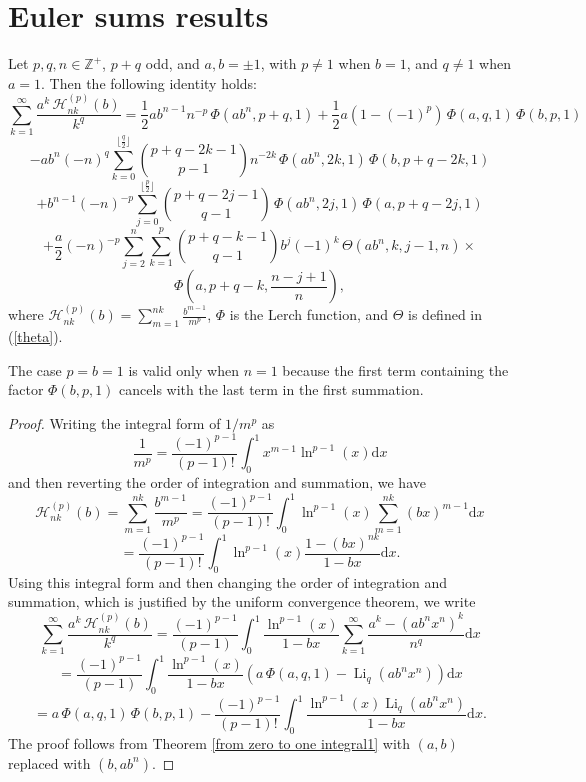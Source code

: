 \documentclass[11pt,reqno]{article}
\begin{document}
\section{Euler sums results}
\begin{theorem} \label{thm of H_n}
	Let $p,q,n\in\mathbb{Z}^{+}$, $p+q$ odd, and $a,b=\pm1$, with $p\neq1$ when $b=1$, and $q\neq1$ when $a=1$. Then the following identity holds:
	\[\sum_{k=1}^\infty\frac{a^k\, \mathcal{H}_{nk}^{(p)}(b)}{k^q}=\frac12 ab^{n-1}n^{-p}\,\Phi(ab^n,p+q,1)+\frac12a(1-{(-1)}^{p})\,\Phi(a,q,1)\,\Phi(b,p,1)\]
	\[-ab^n{(-n)}^{q}\sum_{k=0}^{\lfloor\frac{q}{2}\rfloor}\binom{p+q-2k-1}{p-1}n^{-2k}\,\Phi(ab^n,2k,1)\,\Phi(b,p+q-2k,1)\]
	\[+b^{n-1}{(-n)}^{-p}\sum_{j=0}^{\lfloor\frac{p}{2}\rfloor}\binom{p+q-2j-1}{q-1}\,\Phi(ab^n,2j,1)\,\Phi(a,p+q-2j,1)\]
	\[+\frac{a}{2}{(-n)}^{-p}\sum_{j=2}^{n}\sum_{k=1}^{p}\binom{p+q-k-1}{q-1}b^{j}{(-1)}^{k}\,\Theta(ab^n,k,j-1,n)\times\]
	\[\Phi\left(a,p+q-k,\frac{n-j+1}{n}\right),\]
	where $\mathcal{H}_{nk}^{(p)}(b)=\sum_{m=1}^{nk}\frac{b^{m-1}}{m^p}$, $\Phi$ is the Lerch function, and $\Theta$ is defined in (\ref{theta}).
\end{theorem}
\begin{remark}
	The case $p=b=1$ is valid only when $n=1$ because the first term containing the factor $\Phi(b,p,1)$ cancels with the last term in the first summation.
\end{remark}
\begin{proof} Writing the integral form of $1/m^{p}$ as
	\[\frac{1}{m^p}=\frac{{(-1)}^{p-1}}{(p-1)!}\int_0^1x^{m-1}\ln^{p-1}(x)\mathrm{d} x\]
	and then reverting the order of integration and summation, we have
	\[\mathcal{H}_{nk}^{(p)}(b)=\sum_{m=1}^{nk}\frac{b^{m-1}}{m^p}=\frac{{(-1)}^{p-1}}{(p-1)!}\int_0^1 \ln^{p-1}(x)\sum_{m=1}^{nk} (bx)^{m-1}\mathrm{d} x\]
	\[=\frac{{(-1)}^{p-1}}{(p-1)!}\int_0^1 \ln^{p-1}(x)\frac{1-(bx)^{nk}}{1-bx}\mathrm{d} x.\]
	Using this integral form and then changing the order of integration and summation, which is justified by the uniform convergence theorem, we write
	\[\sum_{k=1}^\infty\frac{a^k\, \mathcal{H}_{nk}^{(p)}(b)}{k^q}=\frac{{(-1)}^{p-1}}{(p-1)}\int_0^1\frac{\ln^{p-1}(x)}{1-bx}\sum_{k=1}^\infty\frac{a^k-(ab^nx^n)^k}{n^q}\mathrm{d} x\]
	\[=\frac{{(-1)}^{p-1}}{(p-1)}\int_0^1\frac{\ln^{p-1}(x)}{1-bx}\left(a\,\Phi(a,q,1)-\operatorname{Li}_q\left(ab^nx^n\right)\right)\mathrm{d} x\]	
	\[=a\,\Phi(a,q,1)\,\Phi(b,p,1)-\frac{{(-1)}^{p-1}}{(p-1)!}\int_0^1\frac{\ln^{p-1}(x)\operatorname{Li}_q\left(ab^nx^n\right)}{1-bx}\mathrm{d} x.\]
	The proof follows from Theorem \ref{from zero to one integral1} with $(a,b)$ replaced with $(b,ab^n)$.
\end{proof}
\end{document}
